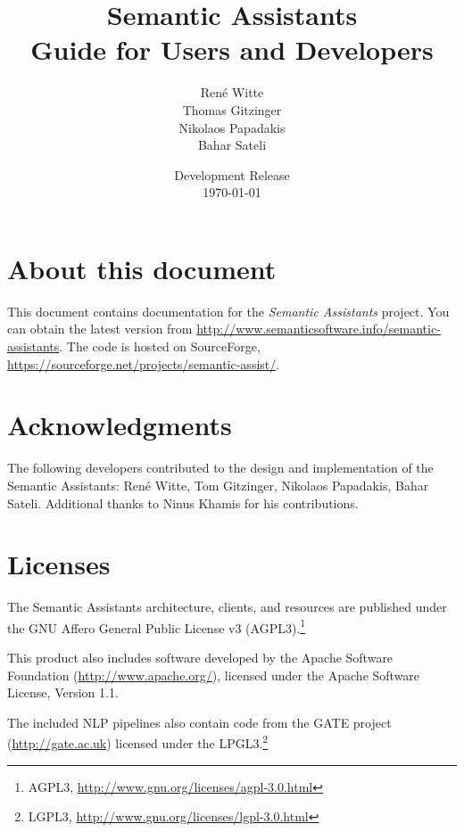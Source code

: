 \documentclass[10pt,twoside,openany,chapterprefix]{scrbook}
\title{Semantic Assistants\bigskip\\
\Large Guide for Users and Developers}
\author{Ren\'{e} Witte\\
Thomas Gitzinger\\
Nikolaos Papadakis\\
Bahar Sateli
\medskip}
\date{Development Release\\
\today
}
\begin{document}
\frontmatter
\maketitle
\tableofcontents

\section*{About this document}
This document contains documentation for the \emph{Semantic
  Assistants} project. You can obtain the latest version from
\url{http://www.semanticsoftware.info/semantic-assistants}. The code
is hosted on SourceForge, \url{https://sourceforge.net/projects/semantic-assist/}.

\section*{Acknowledgments}
The following developers contributed to the design and implementation
of the Semantic Assistants: Ren\'{e} Witte, Tom Gitzinger, Nikolaos
Papadakis, Bahar Sateli. Additional thanks to Ninus Khamis for
his contributions.

\section*{Licenses}
The Semantic Assistants architecture, clients, and resources are
published under the GNU Affero General Public License v3
(AGPL3).\footnote{AGPL3,
  \url{http://www.gnu.org/licenses/agpl-3.0.html}}

This product also includes software developed by the Apache Software
Foundation (\url{http://www.apache.org/}), licensed under the Apache
Software License, Version 1.1.

The included NLP pipelines also contain code from the GATE project
(\url{http://gate.ac.uk}) licensed under the LPGL3.\footnote{LGPL3, \url{http://www.gnu.org/licenses/lgpl-3.0.html}}

\mainmatter







\backmatter
\appendix


\end{document}
